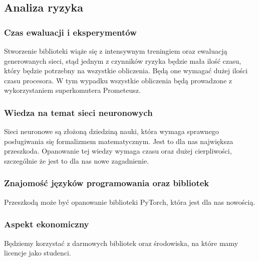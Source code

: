 \subsection{Analiza ryzyka}

\subsubsection{Czas ewaluacji i eksperymentów}
Stworzenie biblioteki wiąże się z intensywnym treningiem oraz ewaluacją
generowanych sieci, stąd jednym z czynników ryzyka będzie mała ilość czasu, który będzie potrzebny na wszystkie 
obliczenia. Będą one wymagać dużej ilości czasu procesora. W tym wypadku wszystkie obliczenia 
będą prowadzone z wykorzystaniem superkomutera Prometeusz.

\subsubsection{Wiedza na temat sieci neuronowych}
Sieci neuronowe są złożoną dziedziną nauki, która wymaga sprawnego posługiwania się formalizmem matematycznym.
Jest to dla nas największa przeszkoda. Opanowanie tej wiedzy wymaga czasu oraz dużej cierpliwości, 
szczególnie że jest to dla nas nowe zagadnienie.

\subsubsection{Znajomość języków programowania oraz bibliotek }
Przeszkodą może być opanowanie biblioteki PyTorch, która jest dla nas nowością.

\subsubsection{Aspekt ekonomiczny }
Będziemy korzystać z darmowych bibliotek oraz środowiska, na które mamy licencje jako studenci.